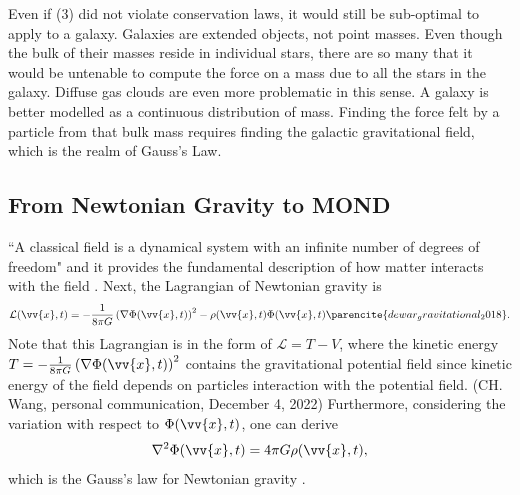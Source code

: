 \documentclass[11pt, twocolumn]{article}
\newcommand{\vx}{\vv{x}}
\newcommand{\ff}[2]{\frac{#1}{#2}}
\begin{document}
    Even if (3) did not violate conservation laws, it would still be sub-optimal to apply to a galaxy. Galaxies are extended objects, not point masses. Even though the bulk of their masses reside in individual stars, there are so many that it would be untenable to compute the force on a mass due to all the stars in the galaxy. Diffuse gas clouds are even more problematic in this sense. A galaxy is better modelled as a continuous distribution of mass. Finding the force felt by a particle from that bulk mass requires finding the galactic gravitational field, which is the realm of Gauss's Law.

    \subsection*{From Newtonian Gravity to MOND}
    ``A classical field is a dynamical system with an infinite number of degrees of freedom" and it provides the fundamental description of how matter interacts with the field \parencite{torre_introduction_2022}.
    Next, the Lagrangian of Newtonian gravity is
    \begin{equation}
        \mathcal{L}(\vx, t) = - \ff{1}{8 \pi G} \left(\nabla \Phi(\vx, t)\right)^2 - \rho(\vx, t) \Phi(\vx, t) \parencite{dewar_gravitational_2018}.
    \end{equation}
    Note that this Lagrangian is in the form of \(\mathcal{L} = T - V\), where the kinetic energy \(T = -\ff{1}{8 \pi G} \left(\nabla \Phi(\vx, t)\right)^2\) contains the gravitational potential field since kinetic energy of the field depends on particles interaction with the potential field. (CH. Wang, personal communication, December 4, 2022) Furthermore, considering the variation with respect to \(\Phi(\vx, t)\), one can derive
    \begin{equation}
        \nabla^2 \Phi(\vx, t) = 4\pi G \rho(\vx, t),
    \end{equation}
    which is the Gauss's law for Newtonian gravity \parencite{dewar_gravitational_2018}.
\end{document}
